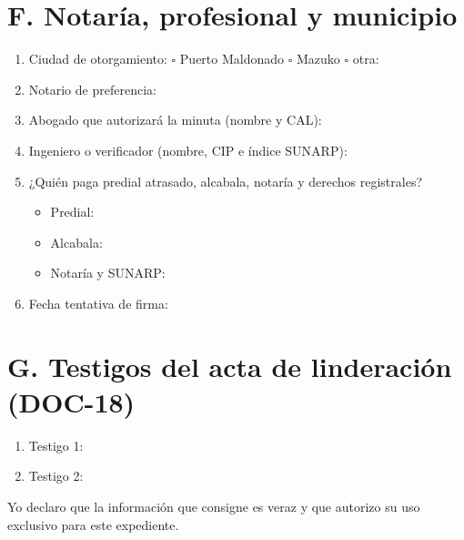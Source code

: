 \documentclass[12pt,a4paper]{article}
\begin{document}
\section*{F. Notaría, profesional y municipio}
\begin{enumerate}[leftmargin=1.15cm]
\item Ciudad de otorgamiento: \quad $\square$ Puerto Maldonado \quad $\square$ Mazuko \quad $\square$ otra: \linea[4cm]
\item Notario de preferencia: \linea[11.2cm]
\item Abogado que autorizará la minuta (nombre y CAL): \linea[8.4cm]
\item Ingeniero o verificador (nombre, CIP e índice SUNARP): \linea[7.6cm]
\item ¿Quién paga predial atrasado, alcabala, notaría y derechos registrales?
\begin{itemize}
\item Predial: \linea[10.5cm]
\item Alcabala: \linea[10.5cm]
\item Notaría y SUNARP: \linea[9.4cm]
\end{itemize}
\item Fecha tentativa de firma: \linea[10.5cm]
\end{enumerate}

\section*{G. Testigos del acta de linderación (DOC-18)}
\begin{enumerate}[leftmargin=1.15cm]
\item Testigo 1: \linea[12.2cm]
\item Testigo 2: \linea[12.2cm]
\end{enumerate}

\vspace{0.5em}
\noindent Yo declaro que la información que consigne es veraz y que autorizo su uso exclusivo para este expediente.

\vspace{0.4em}
\end{document}
